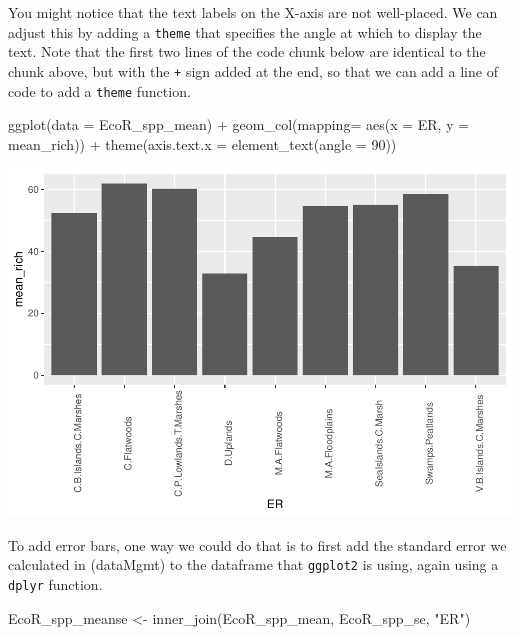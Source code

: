 \documentclass[
]{book}
\newenvironment{Shaded}{\begin{snugshade}}{\end{snugshade}}
\newcommand{\AttributeTok}[1]{\textcolor[rgb]{0.77,0.63,0.00}{#1}}
\newcommand{\DecValTok}[1]{\textcolor[rgb]{0.00,0.00,0.81}{#1}}
\newcommand{\FunctionTok}[1]{\textcolor[rgb]{0.00,0.00,0.00}{#1}}
\newcommand{\NormalTok}[1]{#1}
\newcommand{\OtherTok}[1]{\textcolor[rgb]{0.56,0.35,0.01}{#1}}
\newcommand{\SpecialCharTok}[1]{\textcolor[rgb]{0.00,0.00,0.00}{#1}}
\newcommand{\StringTok}[1]{\textcolor[rgb]{0.31,0.60,0.02}{#1}}
\begin{document}
You might notice that the text labels on the X-axis are not well-placed. We can adjust this by adding a \texttt{theme} that specifies the angle at which to display the text. Note that the first two lines of the code chunk below are identical to the chunk above, but with the \texttt{+} sign added at the end, so that we can add a line of code to add a \texttt{theme} function.

\begin{Shaded}
\begin{Highlighting}[]
\FunctionTok{ggplot}\NormalTok{(}\AttributeTok{data =}\NormalTok{ EcoR\_spp\_mean) }\SpecialCharTok{+}
  \FunctionTok{geom\_col}\NormalTok{(}\AttributeTok{mapping=} \FunctionTok{aes}\NormalTok{(}\AttributeTok{x =}\NormalTok{ ER, }\AttributeTok{y =}\NormalTok{ mean\_rich)) }\SpecialCharTok{+}
  \FunctionTok{theme}\NormalTok{(}\AttributeTok{axis.text.x =} \FunctionTok{element\_text}\NormalTok{(}\AttributeTok{angle =} \DecValTok{90}\NormalTok{))}
\end{Highlighting}
\end{Shaded}

\includegraphics{bookdown-demo_files/figure-latex/unnamed-chunk-10-1.pdf}

To add error bars, one way we could do that is to first add the standard error we calculated in \citet{ref}(dataMgmt) to the dataframe that \texttt{ggplot2} is using, again using a \texttt{dplyr} function.

\begin{Shaded}
\begin{Highlighting}[]
\NormalTok{EcoR\_spp\_meanse }\OtherTok{\textless{}{-}} \FunctionTok{inner\_join}\NormalTok{(EcoR\_spp\_mean, EcoR\_spp\_se, }\StringTok{"ER"}\NormalTok{)}
\end{Highlighting}
\end{Shaded}
\end{document}
